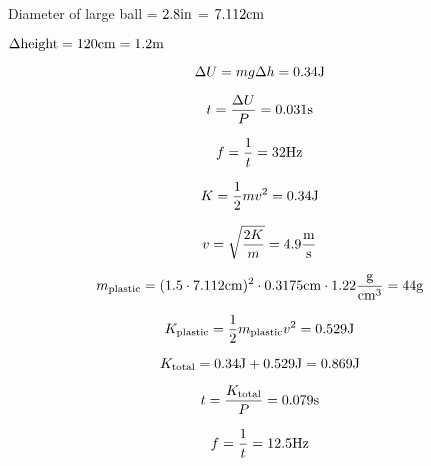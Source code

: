 Diameter of large ball = $2.8\rm{in}$ = $7.112\rm{cm}$

$\Delta \rm{height} = 120\rm{cm} = 1.2\rm{m}$

\[\Delta U = m g \Delta h = 0.34\rm{J}\]

\[t = \frac{\Delta U}{P} = 0.031\rm{s}\]

\[f = \frac{1}{t} = 32\rm{Hz}\]

\[K = \frac{1}{2} m v^2 = 0.34\rm{J}\]

\[v = \sqrt{\frac{2 K}{m}} = 4.9\frac{\rm{m}}{\rm{s}}\]

\[m_{\rm{plastic}} = (1.5 \cdot 7.112\rm{cm})^2 \cdot 0.3175\rm{cm} \cdot 1.22\frac{\rm{g}}{\rm{cm}^3}
 = 44\rm{g}
\]

\[K_{\rm{plastic}} = \frac{1}{2} m_{\rm{plastic}} v^2 = 0.529\rm{J}\]

\[K_{\rm{total}} = 0.34\rm{J} + 0.529\rm{J} = 0.869\rm{J}\]

\[t = \frac{K_{\rm{total}}}{P} = 0.079\rm{s}\]

\[f = \frac{1}{t} = 12.5\rm{Hz}\]